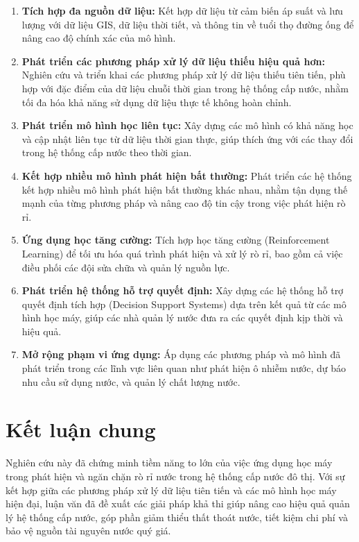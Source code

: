 \begin{enumerate}
    \item \textbf{Tích hợp đa nguồn dữ liệu:} Kết hợp dữ liệu từ cảm biến áp suất và lưu lượng với dữ liệu GIS, dữ liệu thời tiết, và thông tin về tuổi thọ đường ống để nâng cao độ chính xác của mô hình.
    
    \item \textbf{Phát triển các phương pháp xử lý dữ liệu thiếu hiệu quả hơn:} Nghiên cứu và triển khai các phương pháp xử lý dữ liệu thiếu tiên tiến, phù hợp với đặc điểm của dữ liệu chuỗi thời gian trong hệ thống cấp nước, nhằm tối đa hóa khả năng sử dụng dữ liệu thực tế không hoàn chỉnh.
    
    \item \textbf{Phát triển mô hình học liên tục:} Xây dựng các mô hình có khả năng học và cập nhật liên tục từ dữ liệu thời gian thực, giúp thích ứng với các thay đổi trong hệ thống cấp nước theo thời gian.
    
    \item \textbf{Kết hợp nhiều mô hình phát hiện bất thường:} Phát triển các hệ thống kết hợp nhiều mô hình phát hiện bất thường khác nhau, nhằm tận dụng thế mạnh của từng phương pháp và nâng cao độ tin cậy trong việc phát hiện rò rỉ.
    
    \item \textbf{Ứng dụng học tăng cường:} Tích hợp học tăng cường (Reinforcement Learning) để tối ưu hóa quá trình phát hiện và xử lý rò rỉ, bao gồm cả việc điều phối các đội sửa chữa và quản lý nguồn lực.
    
    \item \textbf{Phát triển hệ thống hỗ trợ quyết định:} Xây dựng các hệ thống hỗ trợ quyết định tích hợp (Decision Support Systems) dựa trên kết quả từ các mô hình học máy, giúp các nhà quản lý nước đưa ra các quyết định kịp thời và hiệu quả.
    
    \item \textbf{Mở rộng phạm vi ứng dụng:} Áp dụng các phương pháp và mô hình đã phát triển trong các lĩnh vực liên quan như phát hiện ô nhiễm nước, dự báo nhu cầu sử dụng nước, và quản lý chất lượng nước.
\end{enumerate}

\section{Kết luận chung}

Nghiên cứu này đã chứng minh tiềm năng to lớn của việc ứng dụng học máy trong phát hiện và ngăn chặn rò rỉ nước trong hệ thống cấp nước đô thị. Với sự kết hợp giữa các phương pháp xử lý dữ liệu tiên tiến và các mô hình học máy hiện đại, luận văn đã đề xuất các giải pháp khả thi giúp nâng cao hiệu quả quản lý hệ thống cấp nước, góp phần giảm thiểu thất thoát nước, tiết kiệm chi phí và bảo vệ nguồn tài nguyên nước quý giá.

